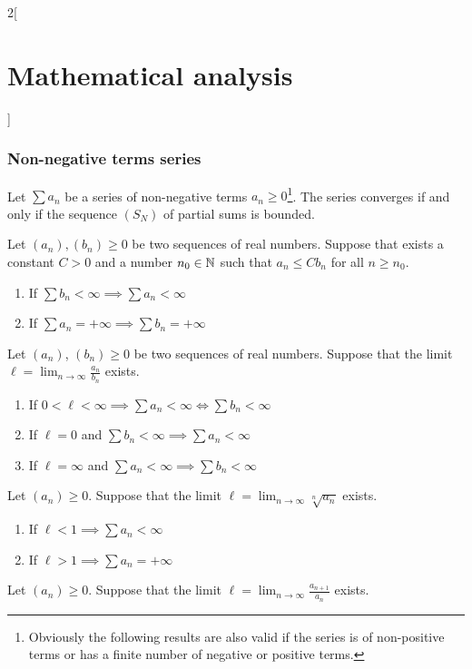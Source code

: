 \documentclass[../../../main.tex]{subfiles}
\begin{document}
\begin{multicols}{2}[\section{Mathematical analysis}]
  \subsubsection{Non-negative terms series}
  \begin{theorem}
    Let $\sum a_n$ be a series of non-negative terms $a_n\geq 0$\footnote{Obviously the following results are also valid if the series is of non-positive terms or has a finite number of negative or positive terms.}. The series converges if and only if the sequence $(S_N)$ of partial sums is bounded.
  \end{theorem}
  \begin{theorem}
    Let $(a_n),(b_n)\geq 0$ be two sequences of real numbers. Suppose that exists a constant $C>0$ and a number $n_0\in\mathbb{N} $ such that $a_n\leq Cb_n$ for all $n\geq n_0$.
    \begin{enumerate}
      \item If $\sum b_n<\infty\implies\sum a_n<\infty$
      \item If $\sum a_n=+\infty\implies\sum b_n=+\infty$
    \end{enumerate}
  \end{theorem}
  \begin{theorem}
    Let $(a_n)$, $(b_n)\geq 0$ be two sequences of real numbers. Suppose that the limit $\ell=\displaystyle\lim_{n\to\infty}\frac{a_n}{b_n}$ exists.
    \begin{enumerate}
      \item If $0<\ell<\infty\implies\sum a_n<\infty\iff\sum b_n<\infty$
      \item If $\ell=0$ and $\sum b_n<\infty\implies\sum a_n<\infty$
      \item If $\ell=\infty$ and $\sum a_n<\infty\implies\sum b_n<\infty$
    \end{enumerate}
  \end{theorem}
  \begin{theorem}
    Let $(a_n)\geq 0$. Suppose that the limit $\displaystyle \ell=\lim_{n\to\infty}\sqrt[n]{a_n}$ exists.
    \begin{enumerate}
      \item If $\ell<1\implies\sum a_n<\infty$
      \item If $\ell>1\implies\sum a_n=+\infty$
    \end{enumerate}
  \end{theorem}
  \begin{theorem}
    Let $(a_n)\geq 0$. Suppose that the limit $\displaystyle \ell=\lim_{n\to\infty}\frac{a_{n+1}}{a_n}$ exists.

\end{theorem}
\end{multicols}
\end{document}
